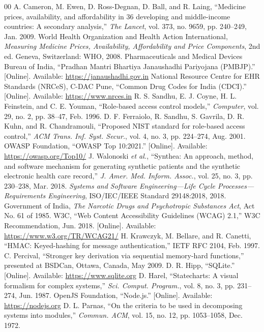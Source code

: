 \documentclass[conference]{IEEEtran}
\begin{document}
\balance
\begin{thebibliography}{00}
 A. Cameron, M. Ewen, D. Ross-Degnan, D. Ball, and R. Laing, ``Medicine prices, availability, and affordability in 36 developing and middle-income countries: A secondary analysis,'' \textit{The Lancet}, vol. 373, no. 9659, pp. 240--249, Jan. 2009.
 World Health Organization and Health Action International, \textit{Measuring Medicine Prices, Availability, Affordability and Price Components}, 2nd ed. Geneva, Switzerland: WHO, 2008.
 Pharmaceuticals and Medical Devices Bureau of India, ``Pradhan Mantri Bhartiya Janaushadhi Pariyojana (PMBJP).'' [Online]. Available: \url{https://janaushadhi.gov.in}
 National Resource Centre for EHR Standards (NRCeS), C-DAC Pune, ``Common Drug Codes for India (CDCI).'' [Online]. Available: \url{https://www.nrces.in}
 R. S. Sandhu, E. J. Coyne, H. L. Feinstein, and C. E. Youman, ``Role-based access control models,'' \textit{Computer}, vol. 29, no. 2, pp. 38--47, Feb. 1996.
 D. F. Ferraiolo, R. Sandhu, S. Gavrila, D. R. Kuhn, and R. Chandramouli, ``Proposed NIST standard for role-based access control,'' \textit{ACM Trans. Inf. Syst. Secur.}, vol. 4, no. 3, pp. 224--274, Aug. 2001.
 OWASP Foundation, ``OWASP Top 10:2021.'' [Online]. Available: \url{https://owasp.org/Top10/}
 J. Walonoski \textit{et al.}, ``Synthea: An approach, method, and software mechanism for generating synthetic patients and the synthetic electronic health care record,'' \textit{J. Amer. Med. Inform. Assoc.}, vol. 25, no. 3, pp. 230--238, Mar. 2018.
 \textit{Systems and Software Engineering---Life Cycle Processes---Requirements Engineering}, ISO/IEC/IEEE Standard 29148:2018, 2018.
 Government of India, \textit{The Narcotic Drugs and Psychotropic Substances Act}, Act No. 61 of 1985.
 W3C, ``Web Content Accessibility Guidelines (WCAG) 2.1,'' W3C Recommendation, Jun. 2018. [Online]. Available: \url{https://www.w3.org/TR/WCAG21/}
 H. Krawczyk, M. Bellare, and R. Canetti, ``HMAC: Keyed-hashing for message authentication,'' IETF RFC 2104, Feb. 1997.
 C. Percival, ``Stronger key derivation via sequential memory-hard functions,'' presented at BSDCan, Ottawa, Canada, May 2009.
 D. R. Hipp, ``SQLite.'' [Online]. Available: \url{https://www.sqlite.org}
 D. Harel, ``Statecharts: A visual formalism for complex systems,'' \textit{Sci. Comput. Program.}, vol. 8, no. 3, pp. 231--274, Jun. 1987.
 OpenJS Foundation, ``Node.js.'' [Online]. Available: \url{https://nodejs.org}
 D. L. Parnas, ``On the criteria to be used in decomposing systems into modules,'' \textit{Commun. ACM}, vol. 15, no. 12, pp. 1053--1058, Dec. 1972.
\end{thebibliography}
\end{document}
